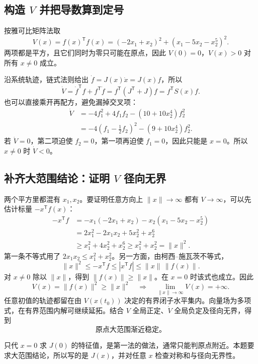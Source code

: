 \subsection{构造 \(V\) 并把导数算到定号}

按雅可比矩阵法取
\[
  V(x)=f(x)^{\mathsf T}f(x)
       =(-2x_1+x_2)^2+(x_1-5x_2-x_2^5)^2 .
\]
两项都是平方，且它们同时为零只可能在原点，因此 $V(0)=0$，$V(x)>0$ 对所有 $x\ne0$ 成立。

沿系统轨迹，链式法则给出 $\dot f=J(x)\dot x=J(x)f$，所以
\[
    \dot V=\dot f^{\mathsf T}f+f^{\mathsf T}\dot f
           =f^{\mathsf T}(J^{\mathsf T}+J)f
           =f^{\mathsf T}S(x)f .
\]
也可以直接乘开再配方，避免漏掉交叉项：
\[
\begin{aligned}
    \dot V
      &=-4f_1^2+4f_1f_2-(10+10x_2^4)f_2^2\\
      &=-4\left(f_1-\frac12 f_2\right)^2-(9+10x_2^4)f_2^2 .
\end{aligned}
\]
若 $\dot V=0$，第二项迫使 $f_2=0$，第一项再迫使 $f_1=0$，因此只能是 $x=0$。所以 $x\ne0$ 时 $\dot V<0$。

\subsection{补齐大范围结论：证明 \(V\) 径向无界}

两个平方里都混有 $x_1,x_2$。要证明任意方向上 $\|x\|\to\infty$ 都有 $V\to\infty$，可以先估计标量 $-x^{\mathsf T}f(x)$：
\[
\begin{aligned}
-x^{\mathsf T}f
   &=-x_1(-2x_1+x_2)-x_2(x_1-5x_2-x_2^5)\\
   &=2x_1^2-2x_1x_2+5x_2^2+x_2^6\\
   &\ge x_1^2+4x_2^2+x_2^6
    \ge x_1^2+x_2^2=\|x\|^2 .
\end{aligned}
\]
第一条不等式用了 $2x_1x_2\le x_1^2+x_2^2$。另一方面，由柯西--施瓦茨不等式，
\[
   \|x\|^2\le -x^{\mathsf T}f
          \le |x^{\mathsf T}f|
          \le \|x\|\,\|f(x)\|.
\]
对 $x\ne0$ 除以 $\|x\|$，得到 $\|f(x)\|\ge\|x\|$。在 $x=0$ 时该式也成立。因此
\[
     V(x)=\|f(x)\|^2\ge\|x\|^2
     \quad\Longrightarrow\quad
     \lim_{\|x\|\to\infty}V(x)=+\infty .
\]
任意初值的轨迹都留在由 $V(x(t_0))$ 决定的有界闭子水平集内。向量场为多项式，在有界范围内解可继续延拓。结合 $V$ 全局正定、$\dot V$ 全局负定及径向无界，得到
\[
       \boxed{\text{原点大范围渐近稳定。}}
\]

\begin{note}
只代 $x=0$ 求 $J(0)$ 的特征值，是第一法的做法，通常只能判原点附近。本题要求大范围结论，所以写的是 $J(x)$，并对任意 $x$ 检查对称和与径向无界性。
\end{note}

